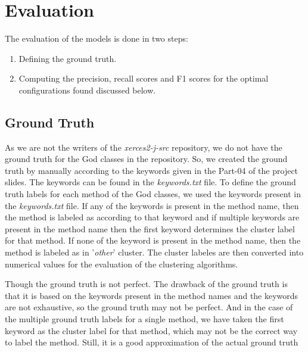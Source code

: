 \documentclass{article}
\newcommand\templateInstruction[1]{
\hl{#1}
}
\begin{document}
\section{Evaluation}
The evaluation of the models is done in two steps:
\begin{enumerate}
    \item Defining the ground truth.
    \item Computing the precision, recall scores and F1 scores for the optimal configurations found discussed below.
\end{enumerate}
\subsection{Ground Truth}
As we are not the writers of the \textit{xerces2-j-src} repository, we do not have the ground truth for the God classes in the repository. So, we created the ground truth by manually according to the keywords given in the Part-04 of the project slides. The keywords can be found in the \textit{keywords.txt} file.
To define the ground truth labels for each method of the God classes, we used the keywords present in the \textit{keywords.txt} file. If any of the keywords is present in the method name, then the method is labeled as according to that keyword and if multiple keywords are present in the method name then the first keyword determines the cluster label for that method. 
If none of the keyword is present in the method name, then the method is labeled as in '\textit{other}' cluster. 
The cluster labeles are then converted into numerical values for the evaluation of the clustering algorithms.

Though the ground truth is not perfect. The drawback of the ground truth is that it is based on the keywords present in the method names and the keywords are not exhaustive, so the ground truth may not be perfect.
And in the case of the multiple ground truth labels for a single method, we have taken the first keyword as the cluster label for that method, which may not be the correct way to label the method.
Still, it is a good approximation of the actual ground truth


\end{document}
